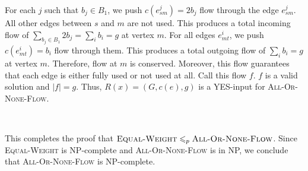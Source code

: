 \documentclass{article}
\begin{document}
For each $j$ such that $b_j\in B_1$, we push $c(e_{sm}^j)=2b_j$ flow through the edge $e_{sm}^j$. All other edges between $s$ and $m$ are not used. This produces a total incoming flow of $\sum_{b_j\in B_1}2b_j=\sum_ib_i=g$ at vertex $m$. For all edges $e_{mt}^i$, we push $c(e_{mt}^i)=b_i$ flow through them. This produces a total outgoing flow of $\sum_ib_i=g$ at vertex $m$. Therefore, flow at $m$ is conserved. Moreover, this flow guarantees that each edge is either fully used or not used at all. Call this flow $f$. $f$ is a valid solution and $|f|=g$. Thus, $R(x)=(G,c(e),g)$ is a YES-input for \textsc{All-Or-None-Flow}.

~

This completes the proof that $\textsc{Equal-Weight}\leqslant_p\textsc{All-Or-None-Flow}$. Since \textsc{Equal-Weight} is NP-complete and \textsc{All-Or-None-Flow} is in NP, we conclude that \textsc{All-Or-None-Flow} is NP-complete.
\end{document}
